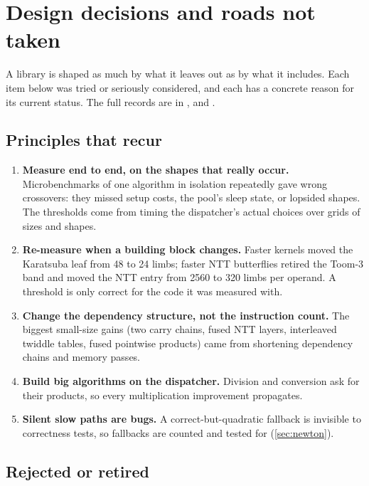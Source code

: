 \chapter{Design decisions and roads not taken}
\label{ch:decisions}

A library is shaped as much by what it leaves out as by what it includes. Each item below was
tried or seriously considered, and each has a concrete reason for its current status. The full
records are in ,  and
.

\section{Principles that recur}

\begin{enumerate}
  \item \textbf{Measure end to end, on the shapes that really occur.} Microbenchmarks of one
        algorithm in isolation repeatedly gave wrong crossovers: they missed setup costs, the
        pool's sleep state, or lopsided shapes. The thresholds come from timing the dispatcher's
        actual choices over grids of sizes and shapes.
  \item \textbf{Re-measure when a building block changes.} Faster kernels moved the Karatsuba
        leaf from 48 to 24 limbs; faster NTT butterflies retired the Toom-3 band and moved the
        NTT entry from 2560 to 320 limbs per operand. A threshold is only correct for the code it
        was measured with.
  \item \textbf{Change the dependency structure, not the instruction count.} The biggest
        small-size gains (two carry chains, fused NTT layers, interleaved twiddle tables, fused
        pointwise products) came from shortening dependency chains and memory passes.
  \item \textbf{Build big algorithms on the dispatcher.} Division and conversion ask
         for their products, so every multiplication improvement propagates.
  \item \textbf{Silent slow paths are bugs.} A correct-but-quadratic fallback is invisible to
        correctness tests, so fallbacks are counted and tested for (\cref{sec:newton}).
\end{enumerate}

\section{Rejected or retired}

